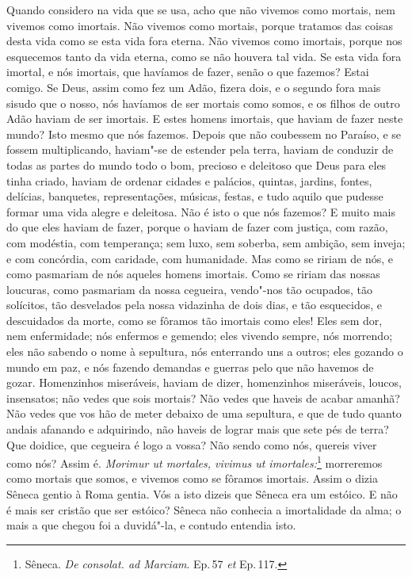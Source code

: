 Quando considero na vida que se usa, acho que não vivemos como mortais,
nem vivemos como imortais. Não vivemos como mortais, porque tratamos das
coisas desta vida como se esta vida fora eterna. Não vivemos como
imortais, porque nos esquecemos tanto da vida eterna, como se não
houvera tal vida. Se esta vida fora imortal, e nós imortais, que
havíamos de fazer, senão o que fazemos? Estai comigo. Se Deus, assim
como fez um Adão, fizera dois, e o segundo fora mais sisudo que o nosso,
nós havíamos de ser mortais como somos, e os filhos de outro Adão haviam
de ser imortais. E estes homens imortais, que haviam de fazer neste
mundo? Isto mesmo que nós fazemos. Depois que não coubessem no Paraíso,
e se fossem multiplicando, haviam"-se de estender pela terra, haviam de
conduzir de todas as partes do mundo todo o bom, precioso e deleitoso
que Deus para eles tinha criado, haviam de ordenar cidades e palácios,
quintas, jardins, fontes, delícias, banquetes, representações, músicas,
festas, e tudo aquilo que pudesse formar uma vida alegre e deleitosa.
Não é isto o que nós fazemos? E muito mais do que eles haviam de fazer,
porque o haviam de fazer com justiça, com razão, com modéstia, com
temperança; sem luxo, sem soberba, sem ambição, sem inveja; e com
concórdia, com caridade, com humanidade. Mas como se ririam de nós, e
como pasmariam de nós aqueles homens imortais. Como se ririam das nossas
loucuras, como pasmariam da nossa cegueira, vendo"-nos tão ocupados, tão
solícitos, tão desvelados pela nossa vidazinha de dois dias, e tão
esquecidos, e descuidados da morte, como se fôramos tão imortais como
eles! Eles sem dor, nem enfermidade; nós enfermos e gemendo; eles
vivendo sempre, nós morrendo; eles não sabendo o nome à sepultura, nós
enterrando uns a outros; eles gozando o mundo em paz, e nós fazendo
demandas e guerras pelo que não havemos de gozar. Homenzinhos
miseráveis, haviam de dizer, homenzinhos miseráveis, loucos,
insensatos; não
vedes que sois mortais? Não vedes que haveis de acabar amanhã? Não vedes
que vos hão de meter debaixo de uma sepultura, e que de tudo quanto
andais afanando e adquirindo, não haveis de lograr mais que sete pés de
terra? Que doidice, que cegueira é logo a vossa? Não sendo como nós,
quereis viver como nós? Assim é. \emph{Morimur ut mortales, vivimus
ut imortales:}\footnote{Sêneca. \emph{De consolat. ad Marciam}. Ep.\,57 \emph{et} Ep.\,117.} morreremos como mortais que somos, e vivemos como se
fôramos imortais. Assim o dizia Sêneca gentio à Roma gentia. Vós a
isto dizeis que Sêneca era um estóico. E não é mais ser cristão que ser
estóico? Sêneca não conhecia a imortalidade da alma; o mais a que chegou
foi a duvidá"-la, e contudo entendia isto.

